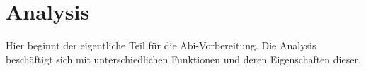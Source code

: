 \chapter{Analysis}
Hier beginnt der eigentliche Teil für die Abi-Vorbereitung. Die Analysis beschäftigt sich mit unterschiedlichen Funktionen und deren Eigenschaften dieser.








